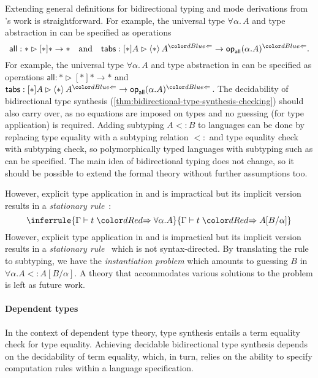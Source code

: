Extending general definitions for bidirectional typing and mode derivations from \citeauthor{Hamana2011}'s work is straightforward. 
\ifarxiv
For example, the universal type $\forall \alpha.\, A$ and type abstraction in \SystemF can be specified as operations
\[
  \mathsf{all} : * \rhd [*] * \to *
  \quad\text{and}\quad
  \mathsf{tabs} : [*] A \rhd \left< * \right> A^{\chk} \to \tyOp_{\mathsf{all}}(\alpha. A)^{\chk}.
\]
\else
For example, the universal type $\forall \alpha.\, A$ and type abstraction in \SystemF can be specified as operations $\mathsf{all} : * \rhd [*] * \to *$ and $\mathsf{tabs} : [*] A \rhd \left< * \right> A^{\chk} \to \tyOp_{\mathsf{all}}(\alpha. A)^{\chk}$.
\fi
The decidability of bidirectional type synthesis (\cref{thm:bidirectional-type-synthesis-checking}) should also carry over, as no equations are imposed on types and no guessing (for type application) is required.
Adding subtyping $A \mathrel{<:} B$ to languages can be done by replacing type equality with a subtyping relation $\mathrel{<:}$ and type equality check with subtyping check, so polymorphically typed languages with subtyping such as \SystemFsub can be specified.
The main idea of bidirectional typing does not change, so it should be possible to extend the formal theory without further assumptions too.

\ifarxiv
However, explicit type application in \SystemF and \SystemFsub is impractical but its implicit version results in a \emph{stationary rule}~\cite{Leivant1986}:
\[
  \inferrule{\Gamma \vdash t \syn \forall \alpha. A}{\Gamma \vdash t \syn A[B/\alpha]}
\]
\else
However, explicit type application in \SystemF and \SystemFsub is impractical but its implicit version results in a \emph{stationary rule}~\cite{Leivant1986}
\fi
which is not syntax-directed.
By translating the rule to subtyping, we have the \emph{instantiation problem} which amounts to guessing $B$ in $\forall \alpha. A <: A[B/\alpha]$.
A theory that accommodates various solutions to the problem is left as future work.

\paragraph{Dependent types}
In the context of dependent type theory, type synthesis entails a term equality check for type equality.
Achieving decidable bidirectional type synthesis depends on the decidability of term equality, which, in turn, relies on the ability to specify computation rules within a language specification.

